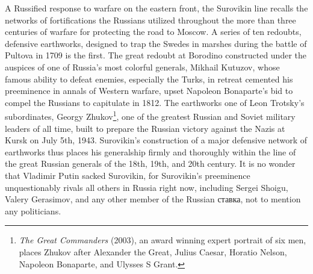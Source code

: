 \documentclass[10pt,a4paper,twoside]{article} %
\begin{document}
\begin{multicols}{2}
{\newline \indent A Russified response to warfare on the eastern front, the Surovikin line recalls the networks of fortifications the Russians utilized throughout the more than three centuries of warfare for protecting the road to Moscow. A series of ten  redoubts, defensive earthworks, designed to trap the Swedes in marshes during the battle of Pultova in 1709 is the first. The great redoubt at Borodino constructed under the auspices of one of Russia's most colorful generals, Mikhail Kutuzov, whose famous ability to defeat enemies, especially the Turks, in retreat cemented his preeminence in annals of Western warfare, upset Napoleon Bonaparte's bid to compel the Russians to capitulate in 1812. The earthworks one of Leon Trotsky's subordinates, Georgy Zhukov\footnote{\emph{The Great Commanders} (2003), an award winning expert portrait of six men, places Zhukov after Alexander the Great, Julius Caesar, Horatio Nelson, Napoleon Bonaparte, and Ulysses S Grant.}, one of the greatest Russian and Soviet military leaders of all time, built to prepare the Russian victory against the Nazis at Kursk on July 5th, 1943. Surovikin's construction of a major defensive network of earthworks thus places his generalship firmly and thoroughly within the line of the great Russian generals of the 18th, 19th, and 20th century. It is no wonder that Vladimir Putin sacked Surovikin, for Surovikin's preeminence unquestionably rivals all others in Russia right now, including Sergei Shoigu, Valery Gerasimov, and any other member of the Russian \textrussian{ставка}, not to mention any politicians. 

}


\end{multicols}
\end{document}
